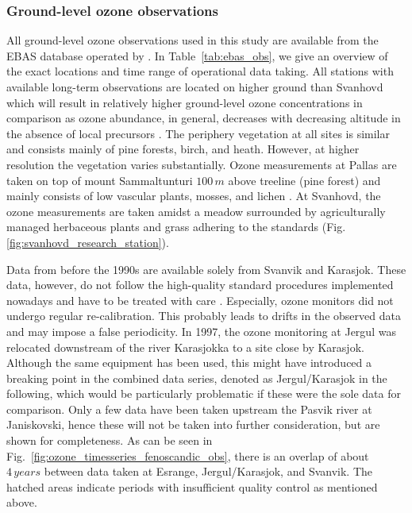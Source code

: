 \documentclass[bg, manuscript]{copernicus}
\begin{document}
\subsubsection{Ground-level ozone observations}
\label{subsubsec:ebas}
All ground-level ozone observations used in this study are available from the EBAS database operated by \citet{NILU_EBAS}. In Table~\ref{tab:ebas_obs}, we give an overview of the exact locations and time range of operational data taking. All stations with available long-term observations are located on higher ground than Svanhovd which will result in relatively higher ground-level ozone concentrations in comparison as ozone abundance, in general, decreases with decreasing altitude in the absence of local precursors \citep[e.g.,][]{AB:Klingberg2009}. The periphery vegetation at all sites is similar and consists mainly of pine forests, birch, and heath. However, at higher resolution the vegetation varies substantially. Ozone measurements at Pallas are taken on top of mount Sammaltunturi $100\,\unit{m}$ above treeline (pine forest) and mainly consists of low vascular plants, mosses, and lichen \citep{BER:Hatakka2003}. At Svanhovd, the ozone measurements are taken amidst a meadow surrounded by agriculturally managed herbaceous plants and grass adhering to the \citet{WMOGuide2018} standards (Fig.\ref{fig:svanhovd_research_station}).

Data from before the 1990s are available solely from Svanvik and Karasjok. These data, however, do not follow the high-quality standard procedures implemented nowadays and have to be treated with care \citep{NILU2003}. Especially, ozone monitors did not undergo regular re-calibration. This probably leads to drifts in the observed data and may impose a false periodicity. In 1997, the ozone monitoring at Jergul was relocated downstream of the river Karasjokka to a site close by Karasjok. Although the same equipment has been used, this might have introduced a breaking point in the combined data series, denoted as Jergul/Karasjok in the following, which would be particularly problematic if these were the sole data for comparison. Only a few data have been taken upstream the Pasvik river at Janiskovski, hence these will not be taken into further consideration, but are shown for completeness. As can be seen in Fig.~\ref{fig:ozone_timesseries_fenoscandic_obs}, there is an overlap of about $4\,\unit{years}$ between data taken at Esrange, Jergul/Karasjok, and Svanvik. The hatched areas indicate periods with insufficient quality control as mentioned above.
\end{document}
